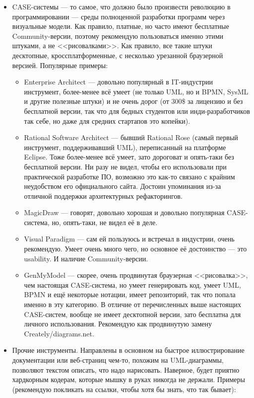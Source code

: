 \documentclass[a5paper]{article}
\begin{document}
\begin{itemize}
\begin{itemize}
    \end{itemize}
    \item CASE-системы --- то самое, что должно было произвести революцию в программировании --- среды полноценной разработки программ через визуальные модели. Как правило, платные, но часто имеют бесплатные Community-версии, поэтому рекомендую пользоваться именно этими штуками, а не <<рисовалками>>. Как правило, все такие штуки десктопные, кроссплатформенные, с несколько урезанной браузерной версией. Популярные примеры:
    \begin{itemize}
        \item Enterprise Architect --- довольно популярный в IT-индустрии инструмент, более-менее всё умеет (не только UML, но и BPMN, SysML и другие полезные штуки) и не очень дорог (от 300\$ за лицензию и без бесплатной версии, так что для бедных студентов или инди-разработчиков так себе, но даже для средних стартапов это копейки).
        \item Rational Software Architect --- бывший Rational Rose (самый первый инструмент, поддерживавший UML), переписанный на платформе Eclipse. Тоже более-менее всё умеет, зато дороговат и опять-таки без бесплатной версии. Ни разу не видел, чтобы его использовали при практической разработке ПО, возможно это как-то связано с крайним неудобством его официального сайта. Достоин упоминания из-за отличной поддержки архитектурных рефакторингов.
        \item MagicDraw --- говорят, довольно хорошая и довольно популярная CASE-система, но, опять-таки, не видел её в деле.
        \item Visual Paradigm --- сам ей пользуюсь и встречал в индустрии, очень рекомендую. Умеет очень много чего, но основное её достоинство --- это usability. И наличие Community-версии.
        \item GenMyModel --- скорее, очень продвинутая браузерная <<рисовалка>>, чем настоящая CASE-система, но умеет генерировать код, умеет UML, BPMN и ещё некоторые нотации, имеет репозиторий, так что попала именно в эту категорию. В отличие от перечисленных выше настоящих CASE-систем, вообще не имеет десктопной версии, зато бесплатна для личного использования. Рекомендую как продвинутую замену Creately/diagrams.net.
    \end{itemize}
    \item Прочие инструменты. Направлены в основном на быстрое иллюстрирование документации или веб-страниц чем-то, похожим на UML-диаграммы, позволяют текстом описать, что надо нарисовать. Наверное, будет приятно хардкорным кодерам, которые мышку в руках никогда не держали. Примеры (рекомендую покликать на ссылки, чтобы хотя бы знать, что так бывает):

\end{itemize}
\end{document}
